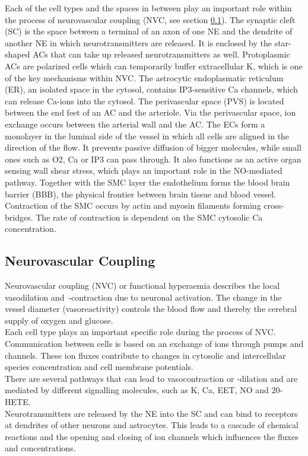 Each of the cell types and the spaces in between play an important role within the process of neurovascular coupling (\gls{NVC}, see section \ref{section:NVC}). The synaptic cleft (\gls{SC}) is the space between a terminal of an axon of one \gls{NE} and the dendrite of another \gls{NE} in which neurotransmitters are released. It is enclosed by the star-shaped \gls{AC}s that can take up released neurotransmitters as well. Protoplasmic \gls{AC}s are  polarized cells which can temporarily buffer extracellular \gls{K}, which is one of the key mechanisms within \gls{NVC}.  The astrocytic endoplasmatic reticulum (\gls{ER}), an isolated space in the cytosol, contains \gls{IP3}-sensitive \gls{Ca} channels, which can release \gls{Ca}-ions into the cytosol. The perivascular space (\gls{PVS}) is located between the end feet of an \gls{AC} and the arteriole. Via the perivascular space, ion exchange occurs between the arterial wall and the \gls{AC}.  The \gls{EC}s form a monolayer in the luminal side of the vessel in which all cells are aligned in the direction of the flow. It prevents passive diffusion of bigger molecules, while small ones such as \gls{O2}, \gls{Ca} or \gls{IP3} can pass through.  It also functions as an active organ sensing wall shear stress, which plays an important role in the \gls{NO}-mediated pathway. Together with the SMC layer the endothelium forms the blood brain barrier (BBB), the physical frontier between brain tissue and blood vessel.
Contraction of the \gls{SMC} occurs by actin and myosin filaments forming cross-bridges. The rate of contraction is dependent on the \gls{SMC} cytosolic \gls{Ca} concentration.\\
 






\subsection{Neurovascular Coupling} \label{section:NVC}
Neurovascular coupling (\gls{NVC}) or functional hyperaemia describes the local vasodilation and~-contraction due to neuronal activation. The change in the vessel diameter (vasoreactivity) controls the blood flow and thereby the cerebral supply of oxygen and glucose. \\
Each cell type plays an important specific role during the process of NVC. Communication between cells is based on an exchange of ions through pumps and channels. These ion fluxes contribute to changes in cytosolic and intercellular species concentration and cell membrane potentials.\\
There are several pathways that can lead to vasocontraction or -dilation and are mediated by different signalling molecules, such as \gls{K}, \gls{Ca}, EET, \gls{NO} and 20-HETE. \\
Neurotransmitters are released by the \gls{NE} into the \gls{SC} and can bind to receptors at dendrites of other neurons and astrocytes. This leads to a cascade of chemical reactions and the opening and closing of ion channels which influences the fluxes and concentrations.

